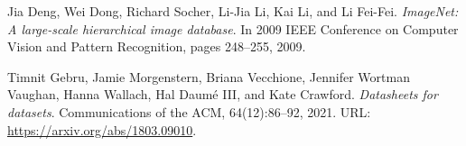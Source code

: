 \documentclass[a4paper,12pt]{article}
\begin{document}
\begin{thebibliography}{9}

Jia Deng, Wei Dong, Richard Socher, Li-Jia Li, Kai Li, and Li Fei-Fei. 
\textit{ImageNet: A large-scale hierarchical image database}. 
In 2009 IEEE Conference on Computer Vision and Pattern Recognition, pages 248--255, 2009.

Timnit Gebru, Jamie Morgenstern, Briana Vecchione, Jennifer Wortman Vaughan, Hanna Wallach, Hal Daum\'{e} III, and Kate Crawford. 
\textit{Datasheets for datasets}. 
Communications of the ACM, 64(12):86--92, 2021. URL: \url{https://arxiv.org/abs/1803.09010}.

\end{thebibliography}
\end{document}
